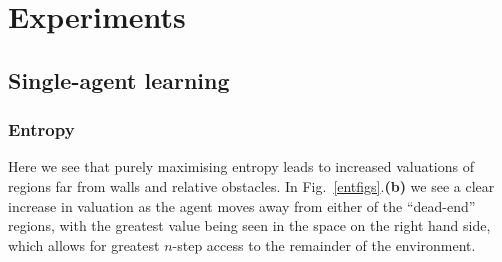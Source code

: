 \documentclass{article}
\begin{document}
\section{Experiments\label{Results}}


\subsection{Single-agent learning\label{singlesect}}
\subsubsection{Entropy\label{entres}}

Here we see that purely maximising entropy leads to increased valuations of regions far from walls and relative obstacles. In Fig.~\ref{entfigs}.\textbf{(b)} we see a clear increase in valuation as the agent moves away from either of the ``dead-end'' regions, with the greatest value being seen in the space on the right hand side, which allows for greatest $n$-step access to the remainder of the environment.
\end{document}
